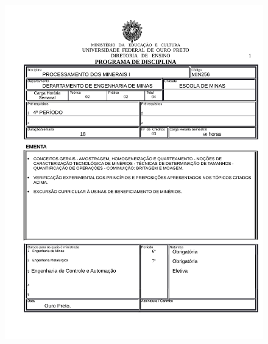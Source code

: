 \begin{figure}[p]
	\centering 
	\includegraphics[scale=0.7]{capitulos/anexo1-programas-disciplina/eg318.pdf}
\end{figure}

